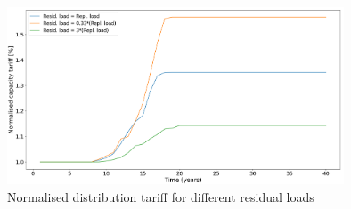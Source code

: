 \noindent
\newline
\begin{figure}[h!]
    \centering
    \includegraphics[width=10cm]{AppendixA/CapTarresid.PNG}
    \caption{Normalised distribution tariff for different residual loads}
    \label{fig:X}
\end{figure}
